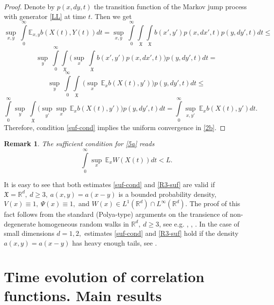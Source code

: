 \documentclass[a4paper,12pt]{article}
\newtheorem{remark}{Remark}[section]
\newcommand{\XXX}{{\mathfrak{X}}}
\begin{document}
\begin{proof} Denote by  $p (x,dy,t)$ the transition function of the Markov jump process with generator \eqref{LL} at time $t$. Then we get
$$
\sup\limits_{x,y} \ \int\limits_{0}^{\infty} \mathbb{E}_{x,y} b(X(t), Y(t)) dt =
\sup\limits_{x,y} \ \int\limits_0^{\infty} \int\limits_{\XXX} \int\limits_{\XXX} b(x', y') p(x, dx',t) p(y, dy',t) dt \le
$$
$$
\sup\limits_{y} \ \int\limits_0^{\infty} \int\limits_{\XXX}  \Big( \sup\limits_{x} \  \int\limits_{\XXX}  b(x', y') p(x, dx', t) \Big)  p(y, dy',t)  dt =
$$
$$
\sup\limits_{y} \ \int\limits_0^{\infty}  \int\limits_{\XXX}  \ \Big( \sup\limits_{x} \ \mathbb{E}_x b(X(t), y')  \Big)  p(y, dy',t) dt \le
$$
$$
\int\limits_0^{\infty} \sup\limits_{y} \ \int\limits_{\XXX}  \Big( \sup\limits_{y'} \sup\limits_{x} \ \mathbb{E}_x b(X(t), y') \Big)  p(y, dy',t) dt =
\int\limits_0^{\infty}  \sup\limits_{x, y'} \ \mathbb{E}_x b(X(t), y') dt.
$$
Therefore, condition \eqref{suf-cond} implies the uniform convergence in \eqref{2b}.
\end{proof}

\begin{remark}\label{R3}
The sufficient condition for \eqref{5a} reads
\begin{equation}\label{R3-suf}
\int\limits_0^{\infty}  \sup\limits_{x} \ \mathbb{E}_x W(X(t)) dt < L.
\end{equation}
\end{remark}


It is easy to see that both estimates \eqref{suf-cond} and \eqref{R3-suf} are valid if $\XXX = \mathbb{R}^d, \ d \ge 3, \ a(x,y) = a(x-y)$ is a bounded probability density, $V(x) \equiv 1, \ \Psi(x) \equiv 1,$ and $W(x) \in L^1(\mathbb{R}^d) \cap L^{\infty}(\mathbb{R}^d)$. The proof of this fact follows from the standard (Polya-type) arguments on the transience of non-degenerate homogeneous random walks in $\mathbb{R}^d, \ d \ge 3$,
see e.g. \cite{LL}, \cite{Petrov}, \cite{PZ-PPI}. %
In the case of small dimensions $d=1,2,$ estimates \eqref{suf-cond} and \eqref{R3-suf} hold if the density $a(x,y) = a(x-y)$ has heavy enough tails, see \cite{KKPZ}.






\section{Time evolution of correlation functions. Main results}
\end{document}
